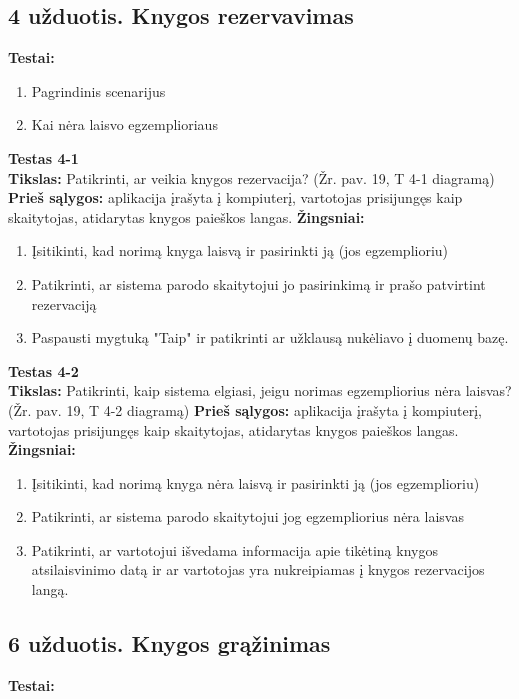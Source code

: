 \documentclass{VUMIFPSkursinis}
\begin{document}
\subsection*{4 užduotis. Knygos rezervavimas}
\textbf{Testai:}

\begin{enumerate}
\item Pagrindinis scenarijus
\item Kai nėra laisvo egzemplioriaus
\end{enumerate}
\hfill \break
\textbf{Testas 4-1}\\
\hfill \break
\textbf{Tikslas:} Patikrinti, ar veikia knygos rezervacija? (Žr. pav. 19, T 4-1 diagramą)
\hfill \break
\hfill \break
\textbf{Prieš sąlygos:} aplikacija įrašyta į kompiuterį, vartotojas prisijungęs kaip skaitytojas, atidarytas knygos paieškos langas.
\hfill \break
\hfill \break
\textbf{Žingsniai:}
\hfill \break
\begin{enumerate}
\item Įsitikinti, kad norimą knyga laisvą ir pasirinkti ją (jos egzemplioriu)
\item Patikrinti, ar sistema parodo skaitytojui jo pasirinkimą ir prašo patvirtint rezervaciją
\item Paspausti mygtuką "Taip" ir patikrinti ar užklausą nukėliavo į duomenų bazę.
\end{enumerate}
\hfill \break
\textbf{Testas 4-2}\\
\hfill \break
\textbf{Tikslas:} Patikrinti, kaip sistema elgiasi, jeigu norimas egzempliorius nėra laisvas? (Žr. pav. 19, T 4-2 diagramą)
\hfill \break
\hfill \break
\textbf{Prieš sąlygos:} aplikacija įrašyta į kompiuterį, vartotojas prisijungęs kaip skaitytojas, atidarytas knygos paieškos langas.
\hfill \break
\hfill \break
\textbf{Žingsniai:}
\hfill \break
\begin{enumerate}
\item Įsitikinti, kad norimą knyga nėra laisvą ir pasirinkti ją (jos egzemplioriu)
\item Patikrinti, ar sistema parodo skaitytojui jog egzempliorius nėra laisvas
\item Patikrinti, ar vartotojui išvedama informacija apie tikėtiną knygos atsilaisvinimo datą ir ar vartotojas yra nukreipiamas į knygos rezervacijos langą.
\end{enumerate}

\subsection*{6 užduotis. Knygos grąžinimas}
\textbf{Testai:}
\end{document}
